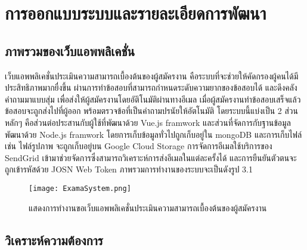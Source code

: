 \chapter{การออกแบบระบบและรายละเอียดการพัฒนา}
\label{chapter:experiment}

\section{ภาพรวมของเว็บแอพพลิเคชั่น}

เว็บแอพพลิเคชั่นประเมินความสามารถเบื้องต้นของผู้สมัครงาน คือระบบที่จะช่วยให้คัดกรองผู้คนได้มีประสิทธิภาพมากยื่งขึ้น ผ่านการทำข้อสอบที่สามารถกำหนดระดับความยากของข้อสอบได้ และดึงคลังคำถามมาแบบสุ่ม เพื่อส่งให้ผู้สมัครงานโดยอัติโนมัติผ่านทางอีเมล เมื่อผู้สมัครงานทำข้อสอบเสร็จแล้ว ข้อสอบจะถูกส่งไปที่ผู้ออก พร้อมตรวจข้อที่เป็นคำถามปรนัยให้อัตโนมัติ โดยระบบนี้แบ่งเป็น 2 ส่วนหลักๆ คือส่วนต่อประสานกับผู้ใช้ที่พัฒนาด้วย Vue.js framwork และส่วนที่จัดการกับฐานข้อมูล พัฒนาด้วย Node.js framwork โดยการเก็บข้อมูลทั่วไปถูกเก็บอยู่ใน mongoDB และการเก็บไฟล์ เช่น ไฟล์รูปภาพ จะถูกเก็บอยู่บน Google Cloud Storage การจัดการอีเมลใช้บริการของ SendGrid เข้ามาช่วยจัดการซึ่งสามารถวิเคราะห์การส่งอีเมลในแต่ละครั้งได้ และการยืนยันตัวตนจะถูกเข้ารหัสด้วย JOSN Web Token ภาพรวมการทำงานของระบบจะเป็นดังรูป 3.1

\begin{figure}[H]
  \centering
  \texttt{[image: ExamaSystem.png]}
  \caption{แสดงการทำงานขอเว็บแอพพลิเคชั่นประเมินความสามารถเบื้องต้นของผู้สมัครงาน}
  \label{Fig:ExamaSystem}
\end{figure}

\newpage
\section{วิเคราะห์ความต้องการ}

